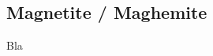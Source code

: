\documentclass[\main/dresen_thesis.tex]{subfiles}
\begin{document}
  \subsection{Magnetite / Maghemite}\label{ch:theoreticalBackground:maghemite}
    Bla
\end{document}
